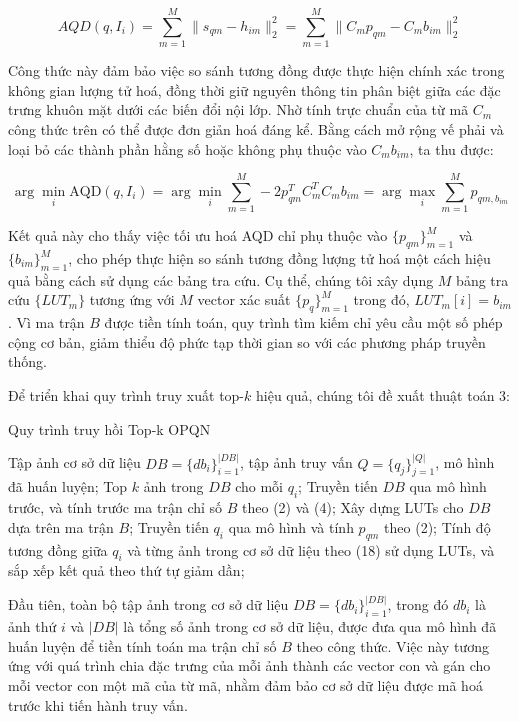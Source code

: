 \begin{equation}
    AQD(q,I_i) = \sum_{m=1}^M \|s_{qm} - h_{im}\|_2^2 = \sum_{m=1}^M \|C_m p_{qm} - C_m b_{im}\|_2^2
\end{equation}

Công thức này đảm bảo việc so sánh tương đồng được thực hiện chính xác trong không gian lượng tử hoá, đồng thời giữ nguyên thông tin phân biệt giữa các đặc trưng khuôn mặt dưới các biến đổi nội lớp. Nhờ tính trực chuẩn của từ mã $C_m$ công thức trên có thể được đơn giản hoá đáng kể. Bằng cách mở rộng vế phải và loại bỏ các thành phần hằng số hoặc không phụ thuộc vào $C_m b_{im}$, ta thu được:

\begin{equation}
    \arg\min_i \text{AQD}(q, I_i) = \arg\min_i \sum_{m=1}^M -2 p_{qm}^T C_m^T C_m b_{im} = \arg\max_i \sum_{m=1}^M p_{qm, b_{im}}
\end{equation}

Kết quả này cho thấy việc tối ưu hoá AQD chỉ phụ thuộc vào $ \{p_{qm}\}_{m=1}^M $ và $ \{b_{im}\}_{m=1}^M $, cho phép thực hiện so sánh tương đồng lượng tử hoá một cách hiệu quả bằng cách sử dụng các bảng tra cứu. Cụ thể, chúng tôi xây dụng $M$ bảng tra cứu $\{LUT_m\}$ tương ứng với $M$ vector xác suất $\{p_q\}_{m=1}^M$ trong đó, $LUT_m[i] = b_{im}$. Vì ma trận $B$ được tiền tính toán, quy trình tìm kiếm chỉ yêu cầu một số phép cộng cơ bản, giảm thiểu độ phức tạp thời gian so với các phương pháp truyền thống.

Để triển khai quy trình truy xuất top-$k$ hiệu quả, chúng tôi đề xuất thuật toán 3: 

\begin{algorithm}
\caption{Quy trình truy hồi Top-k OPQN}
\label{alg:opqn}
\begin{algorithmic}[3]
\Require Tập ảnh cơ sở dữ liệu $DB = \{db_i\}_{i=1}^{|DB|}$, 
        tập ảnh truy vấn $Q = \{q_j\}_{j=1}^{|Q|}$, 
        mô hình đã huấn luyện;
\Ensure Top $k$ ảnh trong $DB$ cho mỗi $q_i$;
\State Truyền tiến $DB$ qua mô hình trước, và tính trước ma trận chỉ số $B$ theo (2) và (4);
\State Xây dựng LUTs cho $DB$ dựa trên ma trận $B$;
    \State Truyền tiến $q_i$ qua mô hình và tính $p_{qm}$ theo (2);
    \State Tính độ tương đồng giữa $q_i$ và từng ảnh trong cơ sở dữ liệu theo (18) sử dụng LUTs, và sắp xếp kết quả theo thứ tự giảm dần;
\EndFor
\end{algorithmic}
\end{algorithm}

Đầu tiên, toàn bộ tập ảnh trong cơ sở dữ liệu $DB = \{db_i\}_{i=1}^{|DB|}$, trong đó $db_i$ là ảnh thứ $i$ và $|DB|$  là tổng số ảnh trong cơ sở dữ liệu, được đưa qua mô hình đã huấn luyện để tiền tính toán ma trận chỉ số $B$ theo công thức. Việc này tương ứng với quá trình chia đặc trưng của mỗi ảnh thành các vector con và gán cho mỗi vector con một mã của từ mã, nhằm đảm bảo cơ sở dữ liệu được mã hoá trước khi tiến hành truy vấn.

